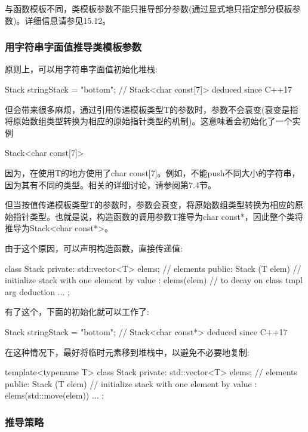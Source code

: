 与函数模板不同，类模板参数不能只推导部分参数(通过显式地只指定部分模板参数)。详细信息请参见15.12。

\subsubsection{用字符串字面值推导类模板参数}

原则上，可以用字符串字面值初始化堆栈:

\begin{cpp}
Stack stringStack = "bottom"; // Stack<char const[7]> deduced since C++17
\end{cpp}

但会带来很多麻烦，通过引用传递模板类型T的参数时，参数不会衰变(衰变是指将原始数组类型转换为相应的原始指针类型的机制)。这意味着会初始化了一个实例

\begin{cpp}
Stack<char const[7]>
\end{cpp}

因为，在使用T的地方使用了char const[7]。例如，不能push不同大小的字符串，因为其有不同的类型。相关的详细讨论，请参阅第7.4节。

但当按值传递模板类型T的参数时，参数会衰变，将原始数组类型转换为相应的原始指针类型。也就是说，构造函数的调用参数T推导为char const*，因此整个类将推导为Stack<char const*>。

由于这个原因，可以声明构造函数，直接传递值:

\begin{cpp}
class Stack {
private:
	std::vector<T> elems; // elements
public:
	Stack (T elem) // initialize stack with one element by value
	: elems({elem}) { // to decay on class tmpl arg deduction
	}
	...
};
\end{cpp}

有了这个，下面的初始化就可以工作了:

\begin{cpp}
Stack stringStack = "bottom"; // Stack<char const*> deduced since C++17
\end{cpp}

在这种情况下，最好将临时元素移到堆栈中，以避免不必要地复制:

\begin{cpp}
template<typename T>
class Stack {
private:
	std::vector<T> elems; // elements
public:
	Stack (T elem) // initialize stack with one element by value
	: elems({std::move(elem)}) {
	}
	...
};
\end{cpp}

\subsubsection{推导策略}

